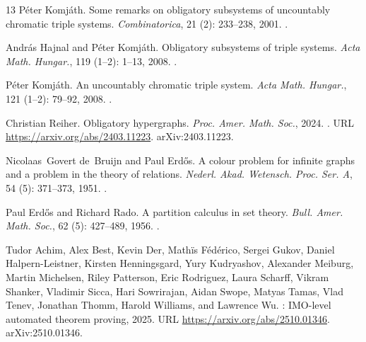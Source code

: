 \documentclass[a4paper,11pt,reqno]{amsart}
\theoremstyle{plain}
\theoremstyle{definition}
\theoremstyle{remark}
\begin{document}
\begin{thebibliography}{13}
P{\'e}ter Komj{\'a}th.
\newblock Some remarks on obligatory subsystems of uncountably chromatic triple
  systems.
\newblock \emph{Combinatorica}, 21 (2): 233--238, 2001.
\newblock {}.

Andr{\'a}s Hajnal and P{\'e}ter Komj{\'a}th.
\newblock Obligatory subsystems of triple systems.
\newblock \emph{Acta Math. Hungar.}, 119 (1--2):
  1--13, 2008.
\newblock {}.

P{\'e}ter Komj{\'a}th.
\newblock An uncountably chromatic triple system.
\newblock \emph{Acta Math. Hungar.}, 121 (1--2):
  79--92, 2008.
\newblock {}.

Christian Reiher.
\newblock Obligatory hypergraphs.
\newblock \emph{Proc. Amer. Math. Soc.}, 2024.
\newblock {}.
\newblock URL \url{https://arxiv.org/abs/2403.11223}.
\newblock arXiv:2403.11223.

Nicolaas~Govert de~Bruijn and Paul Erd{\H{o}}s.
\newblock A colour problem for infinite graphs and a problem in the theory of
  relations.
\newblock \emph{Nederl. Akad. Wetensch. Proc. Ser. A}, 54
  (5): 371--373, 1951.
\newblock {}.

Paul Erd{\H{o}}s and Richard Rado.
\newblock A partition calculus in set theory.
\newblock \emph{Bull. Amer. Math. Soc.}, 62
  (5): 427--489, 1956.
\newblock {}.

Tudor Achim, Alex Best, Kevin Der, Math{\"i}s F{\'e}d{\'e}rico, Sergei Gukov,
  Daniel Halpern-Leistner, Kirsten Henningsgard, Yury Kudryashov, Alexander
  Meiburg, Martin Michelsen, Riley Patterson, Eric Rodriguez, Laura Scharff,
  Vikram Shanker, Vladimir Sicca, Hari Sowrirajan, Aidan Swope, Matyas Tamas,
  Vlad Tenev, Jonathan Thomm, Harold Williams, and Lawrence Wu.
: {IMO}-level automated theorem proving, 2025.
\newblock URL \url{https://arxiv.org/abs/2510.01346}.
\newblock arXiv:2510.01346.

\end{thebibliography}
\end{document}
